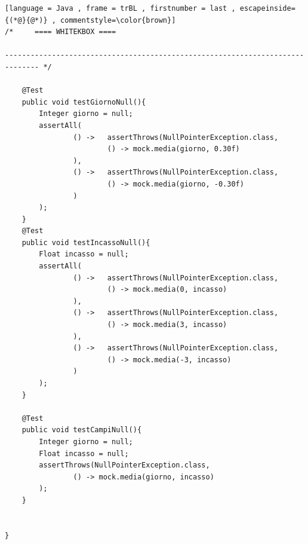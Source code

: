 \begin{lstlisting}[language = Java , frame = trBL , firstnumber = last , escapeinside={(*@}{@*)} , commentstyle=\color{brown}]
/*     ==== WHITEKBOX ====

------------------------------------------------------------------------------ */

    @Test
    public void testGiornoNull(){
        Integer giorno = null;
        assertAll(
                () ->   assertThrows(NullPointerException.class,
                        () -> mock.media(giorno, 0.30f)
                ),
                () ->   assertThrows(NullPointerException.class,
                        () -> mock.media(giorno, -0.30f)
                )
        );
    }
    @Test
    public void testIncassoNull(){
        Float incasso = null;
        assertAll(
                () ->   assertThrows(NullPointerException.class,
                        () -> mock.media(0, incasso)
                ),
                () ->   assertThrows(NullPointerException.class,
                        () -> mock.media(3, incasso)
                ),
                () ->   assertThrows(NullPointerException.class,
                        () -> mock.media(-3, incasso)
                )
        );
    }

    @Test
    public void testCampiNull(){
        Integer giorno = null;
        Float incasso = null;
        assertThrows(NullPointerException.class,
                () -> mock.media(giorno, incasso)
        );
    }


}

\end{lstlisting}


